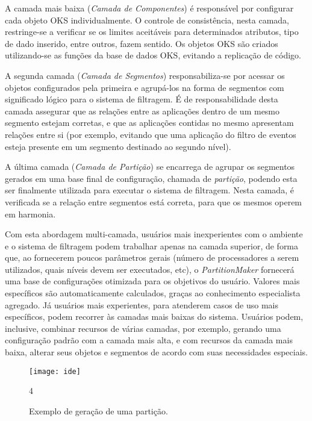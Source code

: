 A camada mais baixa (\emph{Camada de Componentes}) é responsável por configurar cada objeto OKS individualmente. O controle de consistência, nesta camada, restringe-se a verificar se os limites aceitáveis para determinados atributos, tipo de dado inserido, entre outros, fazem sentido. Os objetos OKS são criados utilizando-se as funções da  base de dados OKS, evitando a replicação de código.

A segunda camada (\emph{Camada de Segmentos}) responsabiliza-se por acessar os objetos configurados pela primeira e agrupá-los na forma de segmentos com significado lógico para o sistema de filtragem. É de responsabilidade desta camada assegurar que as relações entre as aplicações dentro de um mesmo segmento estejam corretas, e que as aplicações contidas no mesmo apresentam relações entre si (por exemplo, evitando que uma aplicação do filtro de eventos esteja presente em um segmento destinado ao segundo nível). 

A última camada (\emph{Camada de Partição}) se encarrega de agrupar os segmentos gerados em uma base final de configuração, chamada de \emph{partição}, podendo esta ser finalmente utilizada para executar o sistema de filtragem. Nesta camada, é verificada se a relação entre segmentos está correta, para que os mesmos operem em harmonia.

Com esta abordagem multi-camada, usuários mais inexperientes com o ambiente e o sistema de filtragem podem trabalhar apenas na camada superior, de forma que, ao fornecerem poucos parâmetros gerais (número de processadores a serem utilizados, quais níveis devem ser executados, etc), o \emph{PartitionMaker} fornecerá uma base de configurações otimizada para os objetivos do usuário. Valores mais específicos são automaticamente calculados, graças ao conhecimento especialista agregado. Já usuários mais experientes, para atenderem casos de uso mais específicos, podem recorrer às camadas mais baixas do sistema. Usuários podem, inclusive, combinar recursos de várias camadas, por exemplo, gerando uma configuração padrão com a camada mais alta, e com recursos da camada mais baixa, alterar seus objetos e segmentos de acordo com suas necessidades especiais.

\begin{figure}[t]
\begin{center}
\texttt{[image: ide]}
\caption{Exemplo de geração de uma partição.}
\label{fig:ide}4
\end{center}
\end{figure}

